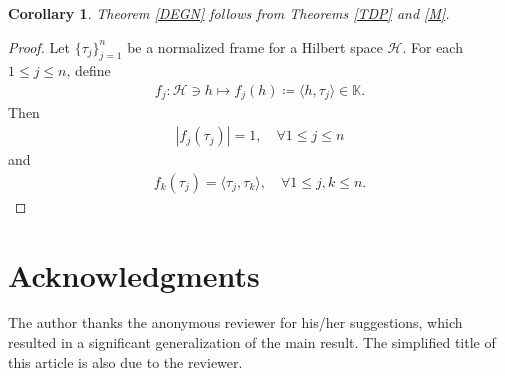 \documentclass{amsart}
\newtheorem{corollary}[theorem] {Corollary}
\begin{document}
\begin{corollary}
Theorem \ref{DEGN} follows from Theorems \ref{TDP}  and 	\ref{M}.
\end{corollary}
\begin{proof}
 	Let $\{\tau_j\}_{j=1}^n$ be a  normalized frame  for  a Hilbert space $\mathcal{H}$. For each $1\leq j \leq n$, define 
 	\begin{align*}
 		f_j:\mathcal{H}\ni h \mapsto f_j(h)\coloneqq \langle h, \tau_j \rangle \in \mathbb{K}.
 	\end{align*}
 Then 
 \begin{align*}
 	|f_j(\tau_j)|=1, \quad \forall 1\leq j \leq n
 \end{align*}
and 
\begin{align*}
	f_k(\tau_j)=\langle \tau_j, \tau_k\rangle, \quad \forall 1\leq j, k \leq n.
\end{align*}
\end{proof}

\section{Acknowledgments}
The author thanks the anonymous reviewer for his/her suggestions, which resulted in a significant generalization of the main result. The simplified title of this article is also due to the reviewer.





 
 
 
\end{document}
